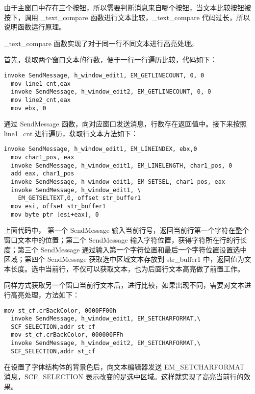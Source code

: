 \documentclass[proposal-report]{bitart}
\begin{document}
由于主窗口中存在三个按钮，所以需要判断消息来自哪个按钮，当文本比较按钮被按下，调用 \_text\_compare 函数进行文本比较，\_text\_compare 代码过长，所以说明函数运行原理。

\_text\_compare 函数实现了对于同一行不同文本进行高亮处理。

首先，获取两个窗口文本的行数，便于一行一行遍历比较，代码如下：

\begin{lstlisting}[language={[x86masm]Assembler}]
  invoke SendMessage, h_window_edit1, EM_GETLINECOUNT, 0, 0
  mov line1_cnt,eax
  invoke SendMessage, h_window_edit2, EM_GETLINECOUNT, 0, 0
  mov line2_cnt,eax
  mov ebx, 0
\end{lstlisting}

通过 SendMessage 函数，向对应窗口发送消息，行数存在返回值中。接下来按照 line1\_cnt 进行遍历，获取行文本方法如下：

\begin{lstlisting}[language={[x86masm]Assembler}]
  invoke SendMessage, h_window_edit1, EM_LINEINDEX, ebx,0
  mov char1_pos, eax
  invoke SendMessage, h_window_edit1, EM_LINELENGTH, char1_pos, 0
  add eax, char1_pos
  invoke SendMessage, h_window_edit1, EM_SETSEL, char1_pos, eax
  invoke SendMessage, h_window_edit1, \
    EM_GETSELTEXT,0, offset str_buffer1
  mov esi, offset str_buffer1
  mov byte ptr [esi+eax], 0
\end{lstlisting}

上面代码中， 第一个 SendMessage 输入当前行号，返回当前行第一个字符在整个窗口文本中的位置；第二个 SendMessage 输入字符位置，获得字符所在行的行长度；第三个 SendMessage 通过输入第一个字符位置和最后一个字符位置设置选中区域；第四个 SendMessage 获取选中区域文本存放到 str\_buffer1 中，返回值为文本长度。选中当前行，不仅可以获取文本，也为后面行文本高亮做了前置工作。

同样方式获取另一个窗口当前行文本后，进行比较，如果出现不同，需要对文本进行高亮处理，方法如下：

\begin{lstlisting}[language={[x86masm]Assembler}]
  mov st_cf.crBackColor, 0000FF00h
  invoke SendMessage, h_window_edit1, EM_SETCHARFORMAT,\
  SCF_SELECTION,addr st_cf
  mov st_cf.crBackColor, 000000FFh
  invoke SendMessage, h_window_edit2, EM_SETCHARFORMAT,\
  SCF_SELECTION,addr st_cf
\end{lstlisting}

在设置了字体结构体的背景色后，向文本编辑器发送 EM\_SETCHARFORMAT 消息，SCF\_SELECTION 表示改变的是选中区域。这样就实现了高亮当前行的效果。
\end{document}
